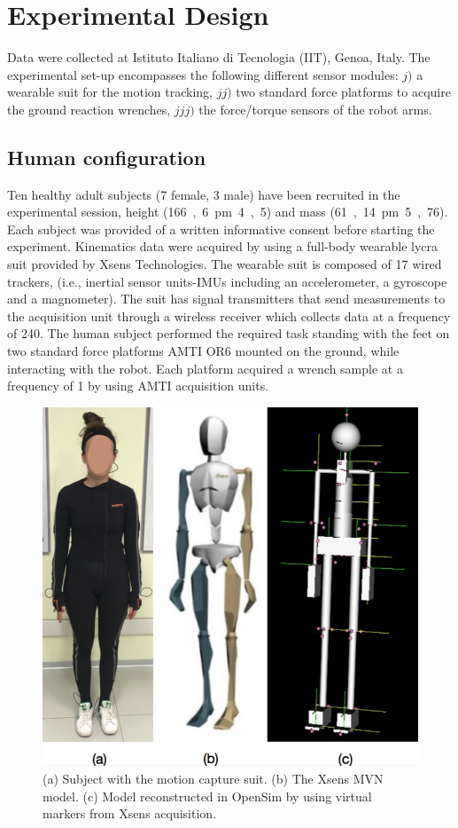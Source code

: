 
\section{Experimental Design}
%
Data were collected at Istituto Italiano di Tecnologia (IIT), Genoa, Italy. The experimental
set-up encompasses the following different sensor modules: 
$j)$ a wearable suit for the motion tracking,
$jj)$ two standard force platforms to acquire the ground reaction wrenches, 
$jjj)$ the force/torque sensors of the robot arms. 
%
\subsection{Human configuration}
Ten healthy adult subjects (7 female, 3 male) have been recruited in the experimental 
session, height (\unit{166,6\pm4,5}{\centi\meter}) and 
mass (\unit{61,14\pm5,76}{\kilo\gram}).
Each subject was provided of a written informative consent before starting the experiment. Kinematics
  data were acquired by using a full-body wearable lycra suit provided by Xsens Technologies.  
The wearable suit is composed of 17 wired trackers, (i.e., inertial sensor units-IMUs including an
 accelerometer, a gyroscope and a magnometer). The suit has signal transmitters that send
  measurements to the acquisition unit through a wireless receiver which collects data at a
   frequency of \unit{240}{\hertz}. The human subject performed the required
    task standing with the
   feet on two standard force platforms AMTI OR6 mounted on the ground, while interacting 
   with the robot.
	  Each platform acquired a wrench sample at a frequency of
	   \unit{1}{\kilo\hertz} by using AMTI acquisition units. 
%
\begin{figure}
  \centering
    \includegraphics[width=0.9\columnwidth]{figs/humanModels}
  \caption{(a) Subject with the motion capture suit. (b) The Xsens MVN model. (c) Model reconstructed in OpenSim by using virtual markers from Xsens acquisition.}
 \label{fig:human_models}
\end{figure}
